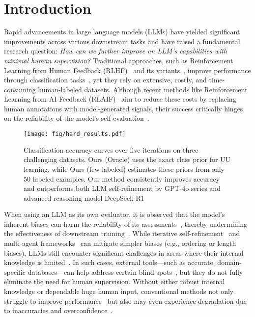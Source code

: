 \section{Introduction}
Rapid advancements in large language models (LLMs) have yielded significant improvements across various downstream tasks and have raised a fundamental research question: \emph{How can we further improve an LLM's capabilities with minimal human supervision?} Traditional approaches, such as Reinforcement Learning from Human Feedback (RLHF)~\citep{Ouyang2022-gr} and its variants~\citep{Rafailov2023-pg, Tang2024-jl}, improve performance through classification tasks~\citep{Tang2024-jl}, yet they rely on extensive, costly, and time-consuming human-labeled datasets. Although recent methods like Reinforcement Learning from AI Feedback (RLAIF)~\citep{bai2022constitutional, Lee2024-og, Zhu2024-tf} aim to reduce these costs by replacing human annotations with model-generated signals, their success critically hinges on the reliability of the model's self-evaluation~\citep{Li2024-ni, Wang2024-yp}.

\begin{figure}[t!]
    \centering
    \texttt{[image: fig/hard\_results.pdf]}
    \caption{Classification accuracy curves over five iterations on three challenging datasets. Ours (Oracle) uses the exact class prior for UU learning, while Ours (few-labeled) estimates these priors from only 50 labeled examples. Our method consistently improves accuracy and outperforms both LLM self-refinement by GPT-4o series and advanced reasoning model DeepSeek-R1}
    \label{fig:hard_dataset}
\end{figure}

When using an LLM as its own evaluator, it is observed that the model's inherent biases can harm the reliability of its assessments~\citep{Koo2024-az, Li2024-xi, Liu2024-oa, Wang2024-yp}, thereby undermining the effectiveness of downstream training~\citep{Baumgartner2024-yq}. While iterative self-refinement~\citep{Kim2023-zz, Madaan2023-fn} and multi-agent frameworks~\citep{Estornell2024-gh} can mitigate simpler biases (e.g., ordering or length biases), LLMs still encounter significant challenges in areas where their internal knowledge is limited~\citep{Kamoi2024-lc}. In such cases, external tools—such as accurate, domain-specific databases—can help address certain blind spots~\citep{Wu2024-cb}, but they do not fully eliminate the need for human supervision. Without either robust internal knowledge or dependable huge human input, conventional methods not only struggle to improve performance~\citep{Huang2024-co,Kamoi2024-lc} but also may even experience degradation due to inaccuracies and overconfidence~\citep{Huang2024-co}.

